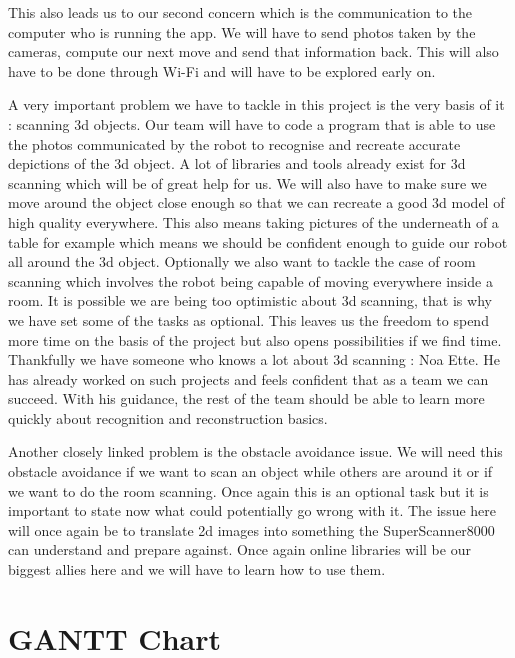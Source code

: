 \documentclass{article}
\begin{document}
This also leads us to our second concern which is the communication to the computer who is running the app. We will have to send photos taken by the cameras, compute our next move and send that information back. This will also have to be done through Wi-Fi and will have to be explored early on.

A very important problem we have to tackle in this project is the very basis of it : scanning 3d objects. Our team will have to code a program that is able to use the photos communicated by the robot to recognise and recreate accurate depictions of the 3d object. A lot of libraries and tools already exist for 3d scanning which will be of great help for us. We will also have to make sure we move around the object close enough so that we can recreate a good 3d model of high quality everywhere. This also means taking pictures of the underneath of a table for example which means we should be confident enough to guide our robot all around the 3d object. Optionally we also want to tackle the case of room scanning which involves the robot being capable of moving everywhere inside a room. It is possible we are being too optimistic about 3d scanning, that is why we have set some of the tasks as optional. This leaves us the freedom to spend more time on the basis of the project but also opens possibilities if we find time. Thankfully we have someone who knows a lot about 3d scanning : Noa Ette. He has already worked on such projects and feels confident that as a team we can succeed. With his guidance, the rest of the team should be able to learn more quickly about recognition and reconstruction basics.

Another closely linked problem is the obstacle avoidance issue. We will need this obstacle avoidance if we want to scan an object while others are around it or if we want to do the room scanning. Once again this is an optional task but it is important to state now what could potentially go wrong with it. The issue here will once again be to translate 2d images into something the SuperScanner8000 can understand and prepare against. Once again online libraries will be our biggest allies here and we will have to learn how to use them.

\newpage

\section{GANTT Chart}
\end{document}
